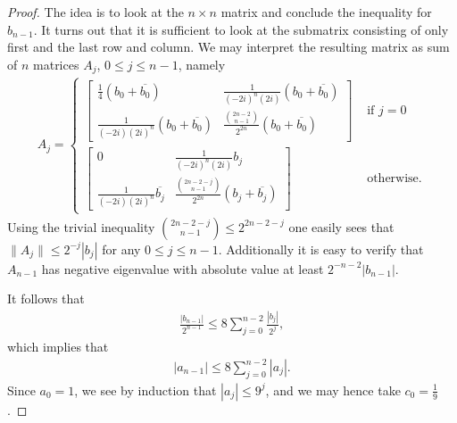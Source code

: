 \begin{proof}
	The idea is to look at the $n \times n$ matrix and conclude the inequality for $b_{n - 1}$. It turns out that it is sufficient to look at the submatrix consisting of only first and the last row and column. We may interpret the resulting matrix as sum of $n$ matrices $A_{j}$, $0 \leq j \leq n - 1$, namely
	\begin{align*}
		A_{j} =
		\begin{cases}
			\begin{bmatrix}
				\frac{1}{4}(b_{0} + \overline{b_{0}}) & \frac{1}{(-2i)^{n}(2i)}(b_{0} + \overline{b_{0}}) \\
				\frac{1}{(-2 i)(2 i)^{n}}(b_{0} + \overline{b_{0}}) &  \frac{\binom{2 n - 2}{n - 1}}{2^{2 n}}(b_{0} + \overline{b_{0}})
			\end{bmatrix}
			& \text{ if } j = 0 \\
			\begin{bmatrix}
				0 &  \frac{1}{(-2i)^{n}(2i)}b_{j} \\
				\frac{1}{(-2 i)(2 i)^{n}}\overline{b_{j}} & \frac{\binom{2 n - 2 - j}{n - 1}}{2^{2 n}}(b_{j} + \overline{b_{j}})
			\end{bmatrix}
			& \text{ otherwise}.
		\end{cases}
	\end{align*}
	Using the trivial inequality $\binom{2 n - 2 - j}{n - 1} \leq 2^{2 n - 2 - j}$ one easily sees that $\|A_{j}\| \leq 2^{-j}|b_{j}|$ for any $0 \leq j \leq n - 1$. Additionally it is easy to verify that $A_{n - 1}$ has negative eigenvalue with absolute value at least $2^{- n - 2}|b_{n - 1}|$.

	It follows that
	\begin{align*}
		\frac{|b_{n - 1}|}{2^{n - 1}} \leq 8 \sum_{j = 0}^{n - 2} \frac{|b_{j}|}{2^{j}},
	\end{align*}
	which implies that
	\begin{align*}
		|a_{n - 1}| \leq 8 \sum_{j = 0}^{n - 2} |a_{j}|.
	\end{align*}
	Since $a_{0} = 1$, we see by induction that $|a_{j}| \leq 9^{j}$, and we may hence take $c_{0} = \frac{1}{9}$.
\end{proof}

